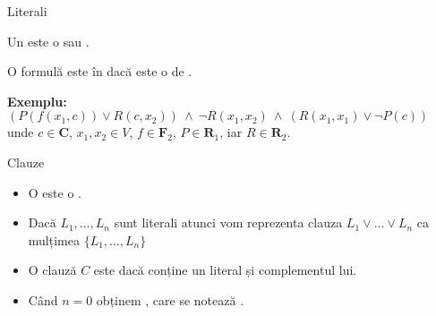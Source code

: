 \documentclass[xcolor=pdftex,romanian,colorlinks]{beamer}
\begin{document}
\begin{frame}{Literali }


Un  este o  sau .

\vfill

O formulă este în  dacă este o  de . 

\textbf{\color{True} Exemplu:} $(P(f(x_1,c)) \vee R(c,x_2)) \ \wedge \ \neg R(x_1,x_2)\ \wedge\ (R(x_1,x_1) \vee \neg P(c))$ \\
unde $c \in \mathbf{C}$, $x_1,x_2 \in V$, $f \in \mathbf{F}_2$, $P \in \mathbf{R}_1$, iar $R\in\mathbf{R}_2$. 
\end{frame}

\begin{frame}{Clauze}

\begin{itemize}
\item  O  este o .

\medskip 

\item Dacă $L_1,\ldots, L_n$ sunt literali atunci vom reprezenta clauza
$L_1\vee\ldots\vee L_n$ ca mulțimea
$\{L_1,\ldots, L_n\}$

\begin{center}
\end{center}



\medskip 
\item O clauză $C$ este  dacă conține un literal și complementul lui. 

\medskip 
\item Când $n=0$ obținem , care se notează \intens{$\Box$}. 


%


\end{itemize}
 
\end{frame}
\end{document}
